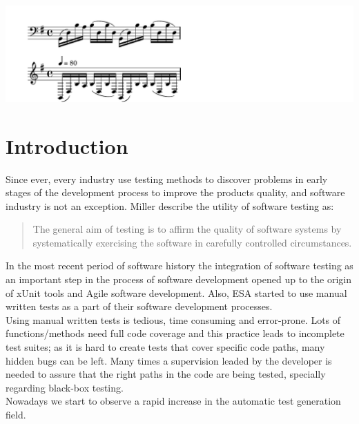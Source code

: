 \cleardoublepage
\begin{savequote}[10pc]
{%
\parindent 0pt
\ifx\preLilyPondExample \undefined
\else
  \expandafter\preLilyPondExample
\fi
\def\lilypondbook{}%
\includegraphics[width=3.5\textwidth]{images/bachPrelude}
\ifx\postLilyPondExample \undefined
\else
  \expandafter\postLilyPondExample
\fi
}
\end{savequote}
\chapter{Introduction}
\minitoc

Since ever, every industry use testing methods to discover problems in early stages of the development process to improve
the products quality, and software industry is not an exception. Miller\cite{miller} describe the utility
of software testing as:

\begin{quotation}
The general aim of testing is to affirm the quality of software systems by systematically
exercising the software in carefully controlled circumstances.
\end{quotation}

In the most recent period of software history the integration of
software testing as an important step in the process of
software development opened up to the origin of xUnit\cite{xunit}
tools and Agile software development.
Also, \ac{ESA} started to use manual written tests as a part of their
software development processes.\\
Using  manual written tests is tedious, time consuming and error-prone.
Lots of functions/methods need full code coverage and this practice
leads to incomplete test suites;
as it is hard to create tests that cover specific code paths, many
hidden bugs can be left.
Many times a supervision leaded by the developer
is needed to assure that the right paths in the code are being tested,
specially regarding black-box testing.\\
Nowadays we start to observe a rapid increase in the automatic test
generation field.

